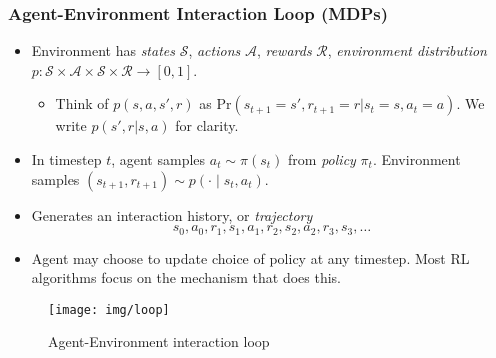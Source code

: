 \documentclass[10pt,a4paper]{beamer}
\renewcommand{\S}{\mathcal{S}}
\newcommand{\A}{\mathcal{A}}
\newcommand{\R}{\mathcal{R}}
\renewcommand{\Pr}{\text{Pr}}
\begin{document}
\begin{frame}
	\frametitle{Agent-Environment Interaction Loop (MDPs)}
	\begin{itemize}
		\item Environment has \textit{states} $\S$,
		\textit{actions} $\A$, \textit{rewards} $\R$, \textit{environment
		distribution}
		$p : \S \times \A \times \S \times \R  \to [0,1]$. 
		\pause
		\begin{itemize}
		\item Think of $p(s,a,s',r)$ as 
		$\Pr(s_{t+1} = s',r_{t+1} = r | s_t = s, a_t = a)$.
		We write $p(s',r | s,a)$ for clarity.
		\end{itemize}
		\pause
		\item In timestep $t$, agent samples $a_t \sim \pi(s_t)$ 
		from \textit{policy} $\pi_t$. Environment samples 
		$(s_{t+1}, r_{t+1}) \sim p(\cdot \mid s_t,a_t)$.
		\pause
		\item Generates an interaction history, or \textit{trajectory}
		$$
		s_0, a_0, r_1, s_1, a_1, r_2, s_2, a_2, r_3, s_3, \ldots
		$$
		\pause
		\item Agent may choose to update choice of policy at any timestep.
		Most RL algorithms focus on the mechanism that does this.
		\pause
	\end{itemize}
		\begin{figure}
			\centering
			\texttt{[image: img/loop]}
			\caption{Agent-Environment interaction loop}
			\label{fig:loop}
		\end{figure}
		
\end{frame}
\end{document}

